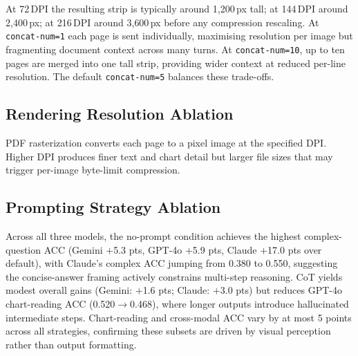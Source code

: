 \documentclass{article} %
\begin{document}
\noindent At 72\,DPI the resulting strip is typically around 1{,}200\,px tall;
at 144\,DPI around 2{,}400\,px; at 216\,DPI around 3{,}600\,px before any
compression rescaling. At \texttt{concat-num=1} each page is sent individually, maximising resolution per image but fragmenting document context across many turns.
At \texttt{concat-num=10}, up to ten pages are merged into one tall strip,
providing wider context at reduced per-line resolution.
The default \texttt{concat-num=5} balances these trade-offs.

\subsection{Rendering Resolution Ablation}
\label{app:abl_dpi}

PDF rasterization converts each page to a pixel image at the specified DPI.
Higher DPI produces finer text and chart detail but larger file sizes
that may trigger per-image byte-limit compression.


\subsection{Prompting Strategy Ablation}
\label{app:abl_prompt}

Across all three models, the no-prompt condition achieves the highest complex-question ACC
(Gemini $+$5.3 pts, GPT-4o $+$5.9 pts, Claude $+$17.0 pts over default),
with Claude's complex ACC jumping from 0.380 to 0.550, suggesting the concise-answer
framing actively constrains multi-step reasoning.
CoT yields modest overall gains (Gemini: $+$1.6 pts; Claude: $+$3.0 pts) but reduces
GPT-4o chart-reading ACC (0.520$\to$0.468), where longer outputs introduce hallucinated
intermediate steps.
Chart-reading and cross-modal ACC vary by at most 5 points across all strategies,
confirming these subsets are driven by visual perception rather than output formatting.
\end{document}
